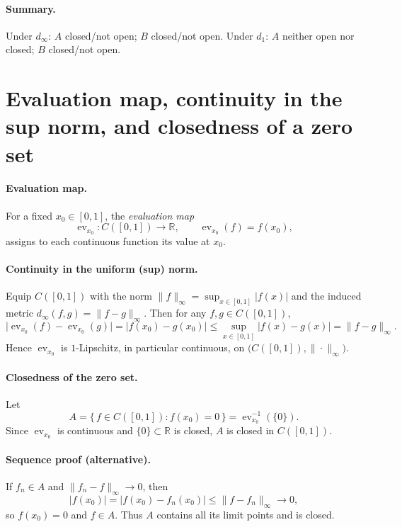 \documentclass[12pt,a4paper]{article}
\begin{document}
\paragraph{Summary.}
Under $d_\infty$: $A$ closed/not open; $B$ closed/not open.  
Under $d_1$: $A$ neither open nor closed; $B$ closed/not open.

\section*{Evaluation map, continuity in the sup norm, and closedness of a zero set}

\paragraph{Evaluation map.}
For a fixed $x_0\in[0,1]$, the \emph{evaluation map}
\[
\operatorname{ev}_{x_0}: C([0,1]) \longrightarrow \mathbb{R},\qquad
\operatorname{ev}_{x_0}(f)=f(x_0),
\]
assigns to each continuous function its value at $x_0$.

\paragraph{Continuity in the uniform (sup) norm.}
Equip $C([0,1])$ with the norm $\|f\|_\infty=\sup_{x\in[0,1]}|f(x)|$ and the induced metric
$d_\infty(f,g)=\|f-g\|_\infty$. Then for any $f,g\in C([0,1])$,
\[
\big|\operatorname{ev}_{x_0}(f)-\operatorname{ev}_{x_0}(g)\big|
=\big|f(x_0)-g(x_0)\big|
\le \sup_{x\in[0,1]} |f(x)-g(x)|
=\|f-g\|_\infty.
\]
Hence $\operatorname{ev}_{x_0}$ is $1$-Lipschitz, in particular continuous, on $\big(C([0,1]),\|\cdot\|_\infty\big)$.

\paragraph{Closedness of the zero set.}
Let
\[
A=\{\,f\in C([0,1]) : f(x_0)=0\,\}=\operatorname{ev}_{x_0}^{-1}(\{0\}).
\]
Since $\operatorname{ev}_{x_0}$ is continuous and $\{0\}\subset\mathbb{R}$ is closed, $A$ is closed in $C([0,1])$.

\paragraph{Sequence proof (alternative).}
If $f_n\in A$ and $\|f_n-f\|_\infty\to 0$, then
\[
|f(x_0)|=|f(x_0)-f_n(x_0)|\le \|f-f_n\|_\infty \longrightarrow 0,
\]
so $f(x_0)=0$ and $f\in A$. Thus $A$ contains all its limit points and is closed.
\end{document}
